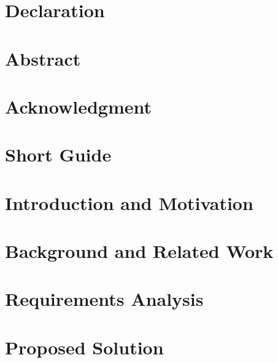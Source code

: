 \documentclass[12pt]{article}
\begin{document}



\section*{Declaration}

\newpage

\section*{Abstract}

\newpage

\section*{Acknowledgment}

\newpage

\tableofcontents
\newpage

\listoffigures
{}
\listoftables
\newpage


\section{Short Guide}


\section{Introduction and Motivation}


\section{Background and Related Work}


\section{Requirements Analysis}


\section{Proposed Solution}

\end{document}
